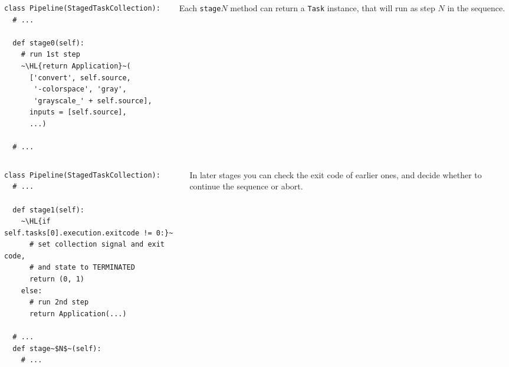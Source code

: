 \documentclass[english,serif,mathserif,xcolor=pdftex,dvipsnames,table]{beamer}
\begin{document}
\begin{frame}[fragile]
  \begin{columns}[c]
    \begin{column}{0.6\textwidth}
      \begin{lstlisting}
class Pipeline(StagedTaskCollection):
  # ...

  def stage0(self):
    # run 1st step
    ~\HL{return Application}~(
      ['convert', self.source,
       '-colorspace', 'gray',
       'grayscale_' + self.source],
      inputs = [self.source],
      ...)

  # ...
      \end{lstlisting}
    \end{column}
    \begin{column}{0.4\textwidth}
      \raggedleft

      Each \texttt{stage$N$} method can return a \texttt{Task}
      instance, that will run as step $N$ in the sequence.
    \end{column}
  \end{columns}
\end{frame}


\begin{frame}[fragile]
  \begin{columns}[c]
    \begin{column}{0.6\textwidth}
      \begin{lstlisting}
class Pipeline(StagedTaskCollection):
  # ...

  def stage1(self):
    ~\HL{if self.tasks[0].execution.exitcode != 0:}~
      # set collection signal and exit code,
      # and state to TERMINATED
      return (0, 1)
    else:
      # run 2nd step
      return Application(...)

  # ...
  def stage~$N$~(self):
    # ...
      \end{lstlisting}
    \end{column}
    \begin{column}{0.4\textwidth}
      \raggedleft

      \+\+\+\+\+
      In later stages you can check the exit code of
      earlier ones, and decide whether to continue the sequence or
      abort.
    \end{column}
  \end{columns}
\end{frame}
\end{document}
